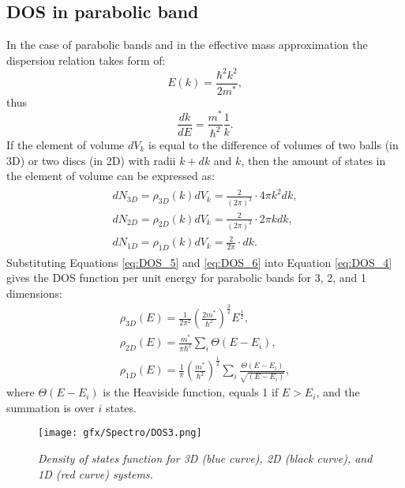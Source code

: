 \documentclass[titlepage,a4paper]{book}
\newcommand{\wciecie}{\quad\phantom{v}}
\begin{document}
\subsection{DOS in parabolic band}
\wciecie
In the case of parabolic bands and in the effective mass approximation the dispersion relation takes form of:
\begin{equation}
\label{eq:DOS_4}
E(k) = \frac{\hbar^2k^2}{2m^*},
\end{equation}
thus
\begin{equation}
\label{eq:DOS_5}
\frac{dk}{dE} = \frac{m^*}{\hbar^2} \frac{1}{k}.
\end{equation}
If the element of volume $dV_k$ is equal to the difference of volumes of two balls (in 3D) or two discs (in 2D) with radii $k+dk$ and $k$, then the amount of states in the element of volume can be expressed as:
\begin{eqnarray}
\label{eq:DOS_6}
\begin{aligned}
dN_{3D} = \rho_{3D} (k) dV_k = \frac{2}{(2\pi)^3} \cdot 4\pi k^2 dk,\\
dN_{2D} = \rho_{2D} (k) dV_k = \frac{2}{(2\pi)^2} \cdot 2\pi k dk, \\
dN_{1D} = \rho_{1D} (k) dV_k = \frac{2}{2\pi} \cdot dk.
\end{aligned}
\end{eqnarray}
Substituting Equations \ref{eq:DOS_5} and \ref{eq:DOS_6} into Equation \ref{eq:DOS_4} gives the DOS function per unit energy for parabolic bands for 3, 2, and 1 dimensions:
\begin{eqnarray}
\label{eq:DOS_7}
\rho_{3D}(E) = \frac{1}{2\pi^2} \left(\frac{2m^*}{\hbar^2} \right)^{\frac{3}{2}} E^\frac{1}{2}, \\
\rho_{2D}(E) = \frac{m^*}{\pi\hbar^2}\sum_i \Theta(E-E_i),\\
\rho_{1D}(E) = \frac{1}{\pi}\left(\frac{m^*}{\hbar^2}\right)^{\frac{1}{2}} \sum_i \frac{\Theta(E-E_i)}{\sqrt{(E-E_i)}} ,
\end{eqnarray}
where $\Theta(E-E_i)$ is the Heaviside function, equals 1 if $E > E_i$, and the summation is over $i$ states. 

\begin{figure}[H]
	\centering
	\texttt{[image: gfx/Spectro/DOS3.png]}
	\vspace{-10pt}
	\caption{\textit{Density of states function for 3D (blue curve), 2D (black curve), and 1D (red curve) systems.}}
	\label{fig:DOS3}
\end{figure}
\end{document}
